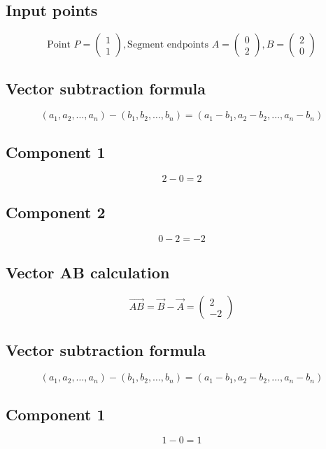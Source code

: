 \documentclass{article}
\begin{document}
\subsection*{ \vspace{1em} Input points}
\[
\text{Point } P = \begin{pmatrix}1 \\ 1\end{pmatrix},
      \text{Segment endpoints } A = \begin{pmatrix}0 \\ 2\end{pmatrix}, B = \begin{pmatrix}2 \\ 0\end{pmatrix}
\]
\subsection*{ \vspace{1em} Vector subtraction formula}
\[
(a_1, a_2, \dots, a_n) - (b_1, b_2, \dots, b_n) = (a_1 - b_1, a_2 - b_2, \dots, a_n - b_n)
\]
\subsection*{ \vspace{1em} Component 1}
\[
2 - 0 = 2
\]
\subsection*{ \vspace{1em} Component 2}
\[
0 - 2 = -2
\]
\subsection*{ \vspace{1em} Vector AB calculation}
\[
\vec{AB} = \vec{B} - \vec{A} = \begin{pmatrix}2 \\ -2\end{pmatrix}
\]
\subsection*{ \vspace{1em} Vector subtraction formula}
\[
(a_1, a_2, \dots, a_n) - (b_1, b_2, \dots, b_n) = (a_1 - b_1, a_2 - b_2, \dots, a_n - b_n)
\]
\subsection*{ \vspace{1em} Component 1}
\[
1 - 0 = 1
\]
\end{document}
